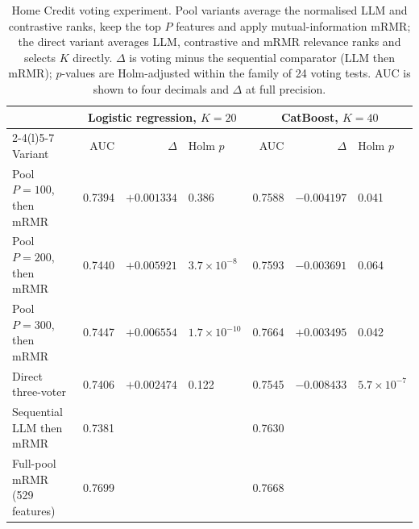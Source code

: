 \documentclass[final,5p,twocolumn]{elsarticle}
\newcommand{\Kfeat}{K}
\begin{document}
\begin{table}[htbp]
\centering
\scriptsize
\setlength{\tabcolsep}{3pt}
\begin{threeparttable}
\caption{Home Credit voting experiment. Pool variants average the normalised LLM and contrastive ranks, keep the top $P$ features and apply mutual-information mRMR; the direct variant averages LLM, contrastive and mRMR relevance ranks and selects $\Kfeat$ directly. $\Delta$ is voting minus the sequential comparator (LLM then mRMR); $p$-values are Holm-adjusted within the family of 24 voting tests. AUC is shown to four decimals and $\Delta$ at full precision.}
\label{tab:voting}
\begin{tabular}{@{}lrrlrrl@{}}
\toprule
 & \multicolumn{3}{c}{Logistic regression, $\Kfeat=20$} & \multicolumn{3}{c}{CatBoost, $\Kfeat=40$} \\
\cmidrule(lr){2-4}\cmidrule(l){5-7}
Variant & AUC & $\Delta$ & Holm $p$ & AUC & $\Delta$ & Holm $p$ \\
\midrule
Pool $P=100$, then mRMR & 0.7394 & $+0.001334$ & 0.386 & 0.7588 & $-0.004197$ & 0.041 \\
Pool $P=200$, then mRMR & 0.7440 & $+0.005921$ & $3.7\times10^{-8}$ & 0.7593 & $-0.003691$ & 0.064 \\
Pool $P=300$, then mRMR & 0.7447 & $+0.006554$ & $1.7\times10^{-10}$ & 0.7664 & $+0.003495$ & 0.042 \\
Direct three-voter & 0.7406 & $+0.002474$ & 0.122 & 0.7545 & $-0.008433$ & $5.7\times10^{-7}$ \\
\midrule
Sequential LLM then mRMR & 0.7381 & & & 0.7630 & & \\
Full-pool mRMR (529 features) & 0.7699 & & & 0.7668 & & \\
\bottomrule
\end{tabular}
\end{threeparttable}
\end{table}
\end{document}
